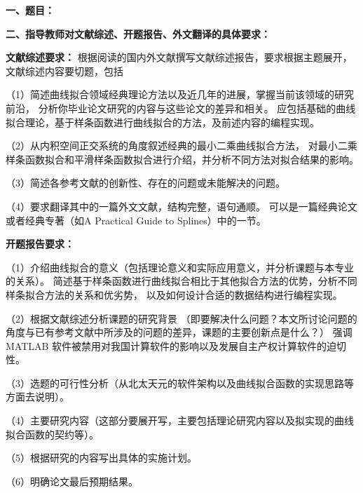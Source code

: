 {
    \setlength{\parindent}{0em}
    \par {\bfseries 一、题目：\Title}
    \\
    \par {\bfseries 二、指导教师对文献综述、开题报告、外文翻译的具体要求：}

    \qquad\textbf{文献综述要求：}
    根据阅读的国内外文献撰写文献综述报告，要求根据主题展开，文献综述内容要切题，包括

    \qquad（1）简述曲线拟合领域经典理论方法以及近几年的进展，掌握当前该领域的研究前沿，
    分析你毕业论文研究的内容与这些论文的差异和相关。
    应包括基础的曲线拟合理论，基于样条函数进行曲线拟合的方法，及前述内容的编程实现。

    \qquad（2）从内积空间正交系统的角度叙述经典的最小二乘曲线拟合方法，
    对最小二乘样条函数拟合和平滑样条函数拟合进行介绍，并分析不同方法对拟合结果的影响。

    \qquad（3）简述各参考文献的创新性、存在的问题或未能解决的问题。

    \qquad（4）要求翻译其中的一篇外文文献，结构完整，语句通顺。
    可以是一篇经典论文或者经典专著（如A Practical Guide to Splines）中的一节。

    \qquad\textbf{开题报告要求：}

    \qquad（1）介绍曲线拟合的意义（包括理论意义和实际应用意义，并分析课题与本专业的关系）。
    简述基于样条函数进行曲线拟合相比于其他拟合方法的优势，分析不同样条拟合方法的关系和优劣势，
    以及如何设计合适的数据结构进行编程实现。

    \qquad（2）根据文献综述分析课题的研究背景
    （即要解决什么问题？本文所讨论问题的角度与已有参考文献中所涉及的问题的差异，课题的主要创新点是什么？）
    强调 MATLAB 软件被禁用对我国计算软件的影响以及发展自主产权计算软件的迫切性。

    \qquad（3）选题的可行性分析（从北太天元的软件架构以及曲线拟合函数的实现思路等方面去说明）。

    \qquad（4）主要研究内容（这部分要展开写，主要包括理论研究内容以及拟实现的曲线拟合函数的契约等）。

    \qquad（5）根据研究的内容写出具体的实施计划。

    \qquad（6）明确论文最后预期结果。
}

\mbox{} \vfill

\signature{指导教师（签名）}
